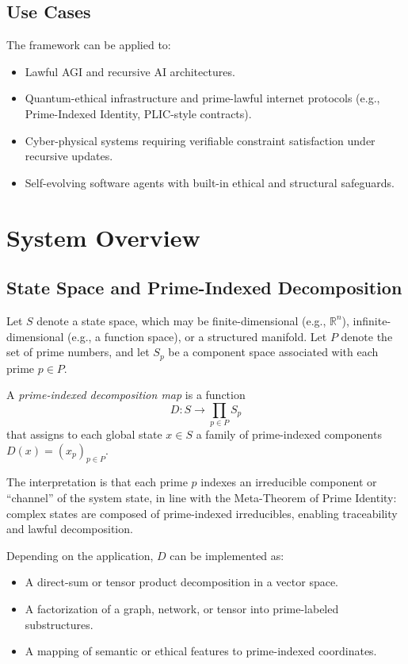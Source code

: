 \documentclass[11pt]{article}
\begin{document}
\subsection{Use Cases}

The framework can be applied to:
\begin{itemize}
  \item Lawful AGI and recursive AI architectures.
  \item Quantum-ethical infrastructure and prime-lawful internet protocols (e.g., Prime-Indexed Identity, PLIC-style contracts).
  \item Cyber-physical systems requiring verifiable constraint satisfaction under recursive updates.
  \item Self-evolving software agents with built-in ethical and structural safeguards.
\end{itemize}

\section{System Overview}

\subsection{State Space and Prime-Indexed Decomposition}

Let \(S\) denote a state space, which may be finite-dimensional (e.g., \(\mathbb{R}^n\)), infinite-dimensional (e.g., a function space), or a structured manifold.%
Let \(P\) denote the set of prime numbers, and let \(S_p\) be a component space associated with each prime \(p \in P\).%

\begin{definition}
A \emph{prime-indexed decomposition map} is a function
\[
  D : S \to \prod_{p \in P} S_p
\]
that assigns to each global state \(x \in S\) a family of prime-indexed components \(D(x) = (x_p)_{p \in P}\).
\end{definition}

The interpretation is that each prime \(p\) indexes an irreducible component or ``channel'' of the system state, in line with the Meta-Theorem of Prime Identity: complex states are composed of prime-indexed irreducibles, enabling traceability and lawful decomposition.%

Depending on the application, \(D\) can be implemented as:
\begin{itemize}
  \item A direct-sum or tensor product decomposition in a vector space.
  \item A factorization of a graph, network, or tensor into prime-labeled substructures.
  \item A mapping of semantic or ethical features to prime-indexed coordinates.
\end{itemize}
\end{document}
